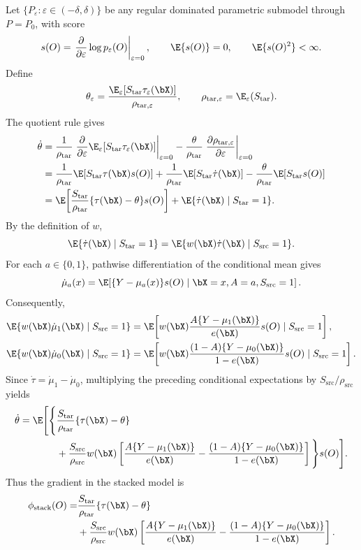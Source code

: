 \documentclass{article}
\begin{document}
Let $\{P_\varepsilon:\varepsilon\in(-\delta,\delta)\}$ be any regular dominated parametric submodel through $P=P_0$, with score
\[
s(O)
=
\left.
\frac{\partial}{\partial\varepsilon}
\log p_\varepsilon(O)
\right|_{\varepsilon=0},
\qquad
\E\{s(O)\}=0,
\qquad
\E\{s(O)^2\}<\infty.
\]
Define
\[
\theta_\varepsilon
=
\frac{
\E_\varepsilon[
S_{\mathrm{tar}}\tau_\varepsilon(\bX)
]
}{
\rho_{\mathrm{tar},\varepsilon}
},
\qquad
\rho_{\mathrm{tar},\varepsilon}
=
\E_\varepsilon(S_{\mathrm{tar}}).
\]
The quotient rule gives
\begin{align*}
\dot\theta
&=
\frac{1}{\rho_{\mathrm{tar}}}
\left.
\frac{\partial}{\partial\varepsilon}
\E_\varepsilon[
S_{\mathrm{tar}}\tau_\varepsilon(\bX)
]
\right|_{\varepsilon=0}
-
\frac{\theta}{\rho_{\mathrm{tar}}}
\left.
\frac{\partial\rho_{\mathrm{tar},\varepsilon}}
     {\partial\varepsilon}
\right|_{\varepsilon=0}
\\
&=
\frac{1}{\rho_{\mathrm{tar}}}
\E[
S_{\mathrm{tar}}\tau(\bX)s(O)
]
+
\frac{1}{\rho_{\mathrm{tar}}}
\E[
S_{\mathrm{tar}}\dot\tau(\bX)
]
-
\frac{\theta}{\rho_{\mathrm{tar}}}
\E[
S_{\mathrm{tar}}s(O)
]
\\
&=
\E\!\left[
\frac{S_{\mathrm{tar}}}{\rho_{\mathrm{tar}}}
\{\tau(\bX)-\theta\}s(O)
\right]
+
\E\{\dot\tau(\bX)\mid S_{\mathrm{tar}}=1\}.
\end{align*}
By the definition of $w$,
\[
\E\{\dot\tau(\bX)\mid S_{\mathrm{tar}}=1\}
=
\E\{w(\bX)\dot\tau(\bX)\mid S_{\mathrm{src}}=1\}.
\]
For each $a\in\{0,1\}$, pathwise differentiation of the conditional mean gives
\[
\dot\mu_a(x)
=
\E\!\left[
\{Y-\mu_a(x)\}s(O)
\mid
\bX=x,A=a,S_{\mathrm{src}}=1
\right].
\]
Consequently,
\begin{align*}
\E\{w(\bX)\dot\mu_1(\bX)\mid S_{\mathrm{src}}=1\}
&=
\E\!\left[
w(\bX)
\frac{A\{Y-\mu_1(\bX)\}}{e(\bX)}
s(O)
\mid S_{\mathrm{src}}=1
\right],\\
\E\{w(\bX)\dot\mu_0(\bX)\mid S_{\mathrm{src}}=1\}
&=
\E\!\left[
w(\bX)
\frac{(1-A)\{Y-\mu_0(\bX)\}}{1-e(\bX)}
s(O)
\mid S_{\mathrm{src}}=1
\right].
\end{align*}
Since $\dot\tau=\dot\mu_1-\dot\mu_0$, multiplying the preceding conditional expectations by
$S_{\mathrm{src}}/\rho_{\mathrm{src}}$ yields
\begin{align*}
\dot\theta
=
\E\Bigg[
\Bigg\{
&
\frac{S_{\mathrm{tar}}}{\rho_{\mathrm{tar}}}
\{\tau(\bX)-\theta\}\\
&+
\frac{S_{\mathrm{src}}}{\rho_{\mathrm{src}}}
w(\bX)
\left[
\frac{A\{Y-\mu_1(\bX)\}}{e(\bX)}
-
\frac{(1-A)\{Y-\mu_0(\bX)\}}{1-e(\bX)}
\right]
\Bigg\}
s(O)
\Bigg].
\end{align*}
Thus the gradient in the stacked model is
\begin{align}
\phi_{\mathrm{stack}}(O)
=
&
\frac{S_{\mathrm{tar}}}{\rho_{\mathrm{tar}}}
\{\tau(\bX)-\theta\}
\notag\\
&+
\frac{S_{\mathrm{src}}}{\rho_{\mathrm{src}}}
w(\bX)
\left[
\frac{A\{Y-\mu_1(\bX)\}}{e(\bX)}
-
\frac{(1-A)\{Y-\mu_0(\bX)\}}{1-e(\bX)}
\right].
\label{eq:eif-path3-stacked}
\end{align}
\end{document}

